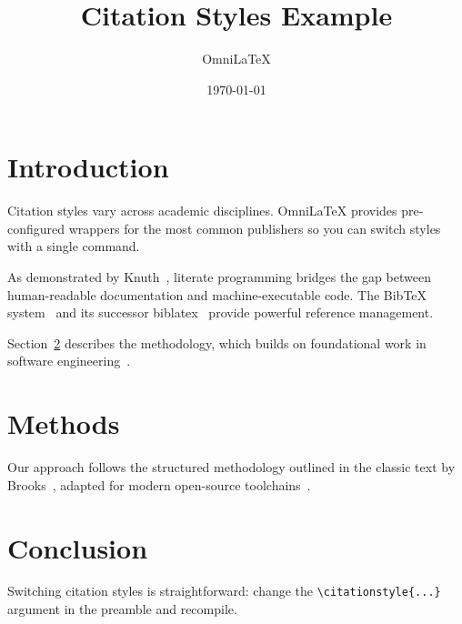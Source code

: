 \documentclass[
    language=english,
    doctype=article,
    institution=none,
]{../../omnilatex}
\title{Citation Styles Example}
\author{OmniLaTeX}
\date{\today}
\begin{document}
\maketitle

\tableofcontents

\section{Introduction}
Citation styles vary across academic disciplines.  OmniLaTeX provides
pre-configured wrappers for the most common publishers so you can switch
styles with a single command.

As demonstrated by Knuth~\cite{knuth1984}, literate programming bridges
the gap between human-readable documentation and machine-executable code.
The BibTeX system~\cite{lamport1994} and its successor
biblatex~\cite{kime2020} provide powerful reference management.

Section~\ref{sec:methods} describes the methodology, which builds on
foundational work in software engineering~\cite{brooks1995}.

\section{Methods}
\label{sec:methods}
Our approach follows the structured methodology outlined in the
classic text by Brooks~\cite{brooks1995}, adapted for modern
open-source toolchains~\cite{kime2020}.

\section{Conclusion}
Switching citation styles is straightforward: change the
\texttt{\textbackslash citationstyle\{...\}} argument in the preamble
and recompile.

\printbibliography
\end{document}
